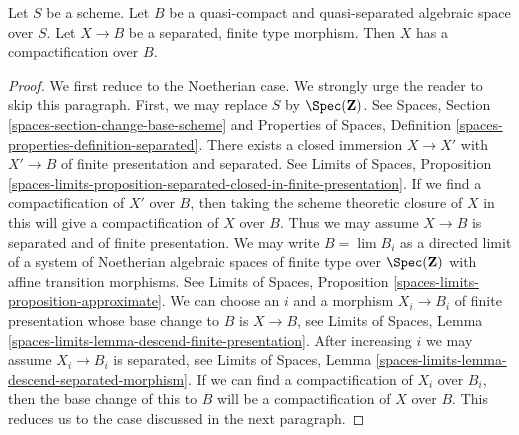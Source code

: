 %
\begin{theorem}
\label{theorem-nagata}
\begin{reference}
\cite{CLO}
\end{reference}
Let $S$ be a scheme. Let $B$ be a quasi-compact and quasi-separated
algebraic space over $S$. Let $X \to B$ be a separated, finite type morphism.
Then $X$ has a compactification over $B$.
\end{theorem}

\begin{proof}
We first reduce to the Noetherian case. We strongly urge the reader
to skip this paragraph. First, we may replace $S$ by $\Spec(\mathbf{Z})$.
See Spaces, Section \ref{spaces-section-change-base-scheme} and
Properties of Spaces, Definition \ref{spaces-properties-definition-separated}.
There exists a closed immersion
$X \to X'$ with $X' \to B$ of finite presentation and separated.
See Limits of Spaces, Proposition
\ref{spaces-limits-proposition-separated-closed-in-finite-presentation}.
If we find a compactification of $X'$ over $B$, then
taking the scheme theoretic closure of $X$ in this will give
a compactification of $X$ over $B$. Thus we may assume
$X \to B$ is separated and of finite presentation.
We may write $B = \lim B_i$ as a directed
limit of a system of Noetherian algebraic spaces
of finite type over $\Spec(\mathbf{Z})$
with affine transition morphisms.
See Limits of Spaces, Proposition \ref{spaces-limits-proposition-approximate}.
We can choose an $i$ and a morphism $X_i \to B_i$ of finite
presentation whose base change to $B$ is $X \to B$, see
Limits of Spaces, Lemma \ref{spaces-limits-lemma-descend-finite-presentation}.
After increasing $i$ we may assume $X_i \to B_i$ is separated, see
Limits of Spaces, Lemma
\ref{spaces-limits-lemma-descend-separated-morphism}.
If we can find a compactification of $X_i$ over $B_i$, then the
base change of this to $B$ will be a compactification of $X$ over $B$.
This reduces us to the case discussed in the next paragraph.


\end{proof}
